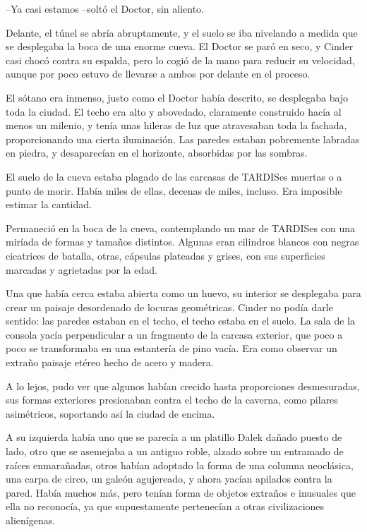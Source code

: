 --Ya casi estamos --soltó el Doctor, sin aliento.



Delante, el túnel se abría abruptamente, y el suelo se iba nivelando a medida que se desplegaba la boca de una enorme cueva. El Doctor se paró en seco, y Cinder casi chocó contra su espalda, pero lo cogió de la mano para reducir su velocidad, aunque por poco estuvo de llevarse a ambos por delante en el proceso.

El sótano era inmenso, justo como el Doctor había descrito, se desplegaba bajo toda la ciudad. El techo era alto y abovedado, claramente construido hacía al menos un milenio, y tenía unas hileras de luz que atravesaban toda la fachada, proporcionando una cierta iluminación. Las paredes estaban pobremente labradas en piedra, y desaparecían en el horizonte, absorbidas por las sombras.

El suelo de la cueva estaba plagado de las carcasas de TARDISes muertas o a punto de morir. Había miles de ellas, decenas de miles, incluso. Era imposible estimar la cantidad.

Permaneció en la boca de la cueva, contemplando un mar de TARDISes con una miríada de formas y tamaños distintos. Algunas eran cilindros blancos con negras cicatrices de batalla, otras, cápsulas plateadas y grises, con sus superficies marcadas y agrietadas por la edad.

Una que había cerca estaba abierta como un huevo, su interior se desplegaba para crear un paisaje desordenado de locuras geométricas. Cinder no podía darle sentido: las paredes estaban en el techo, el techo estaba en el suelo. La sala de la consola yacía perpendicular a un fragmento de la carcasa exterior, que poco a poco se transformaba en una estantería de pino vacía. Era como observar un extraño paisaje etéreo hecho de acero y madera.

A lo lejos, pudo ver que algunos habían crecido hasta proporciones desmesuradas, sus formas exteriores presionaban contra el techo de la caverna, como pilares asimétricos, soportando así la ciudad de encima.

A su izquierda había uno que se parecía a un platillo Dalek dañado puesto de lado, otro que se asemejaba a un antiguo roble, alzado sobre un entramado de raíces enmarañadas, otros habían adoptado la forma de una columna neoclásica, una carpa de circo, un galeón agujereado, y ahora yacían apilados contra la pared. Había muchos más, pero tenían forma de objetos extraños e inusuales que ella no reconocía, ya que supuestamente pertenecían a otras civilizaciones alienígenas.

